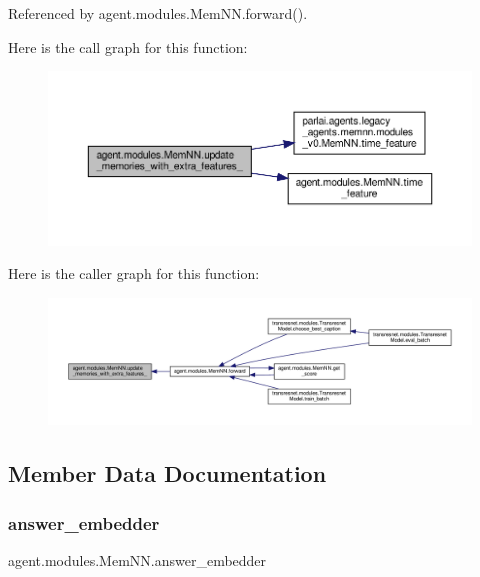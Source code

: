 Referenced by agent.\+modules.\+Mem\+N\+N.\+forward().

Here is the call graph for this function\+:
\nopagebreak
\begin{figure}[H]
\begin{center}
\leavevmode
\includegraphics[width=350pt]{classagent_1_1modules_1_1MemNN_a7f640b99845db4db6508e12e139e3b22_cgraph}
\end{center}
\end{figure}
Here is the caller graph for this function\+:
\nopagebreak
\begin{figure}[H]
\begin{center}
\leavevmode
\includegraphics[width=350pt]{classagent_1_1modules_1_1MemNN_a7f640b99845db4db6508e12e139e3b22_icgraph}
\end{center}
\end{figure}


\subsection{Member Data Documentation}
\mbox{\label{classagent_1_1modules_1_1MemNN_a74a3f3cf77641fd404808cc8820e4ae6}} 
\subsubsection{\texorpdfstring{answer\+\_\+embedder}{answer\_embedder}}
{\footnotesize\ttfamily agent.\+modules.\+Mem\+N\+N.\+answer\+\_\+embedder}



